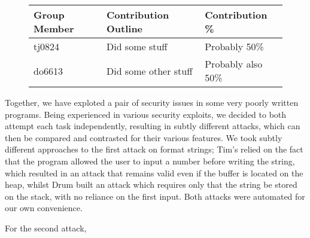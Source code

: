 \begin{figure}[h]
\centering
\begin{tabular}{|l|l|l|}
\hline
{\bf Group Member} & {\bf Contribution Outline} & {\bf Contribution \%} \\
\hline
tj0824 & Did some stuff & Probably 50\% \\
do6613 & Did some other stuff & Probably also 50\% \\
\hline
\end{tabular}
\end{figure}

Together, we have exploted a pair of security issues in some very poorly written programs. Being experienced in various security exploits, we decided to both attempt each task independently, resulting in subtly different attacks, which can then be compared and contrasted for their various features. We took subtly different approaches to the first attack on format strings; Tim's relied on the fact that the program allowed the user to input a number before writing the string, which resulted in an attack that remains valid even if the buffer is located on the heap, whilst Drum built an attack which requires only that the string be stored on the stack, with no reliance on the first input. Both attacks were automated for our own convenience.

For the second attack, 